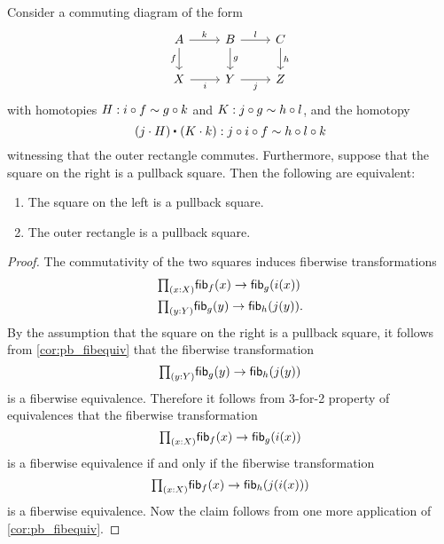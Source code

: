 \begin{cor}\label{thm:pb_pasting}
Consider a commuting diagram of the form
\begin{equation*}
\begin{tikzcd}
A \arrow[r,"k"] \arrow[d,swap,"f"] & B \arrow[r,"l"] \arrow[d,"g"] & C \arrow[d,"h"] \\
X \arrow[r,swap,"i"] & Y \arrow[r,swap,"j"] & Z
\end{tikzcd}
\end{equation*}
with homotopies $H:i\circ f\sim g\circ k$ and $K:j\circ g\sim h\circ l$, and the homotopy
\begin{equation*}
\ct{(j\cdot H)}{(K\cdot k)}:j\circ i\circ f\htpy h\circ l\circ k
\end{equation*}
witnessing that the outer rectangle commutes. Furthermore, suppose that the square on the right is a pullback square. Then the following are equivalent:
\begin{samepage}%
\begin{enumerate}
\item The square on the left is a pullback square.
\item The outer rectangle is a pullback square.
\end{enumerate}%
\end{samepage}%
\end{cor}

\begin{proof}
The commutativity of the two squares induces fiberwise transformations
\begin{align*}
& \prd{x:X}\fib{f}{x}\to \fib{g}{i(x)} \\
& \prd{y:Y}\fib{g}{y}\to \fib{h}{j(y)}.
\end{align*}
By the assumption that the square on the right is a pullback square, it follows from \cref{cor:pb_fibequiv} that the fiberwise transformation
\begin{equation*}
\prd{y:Y}\fib{g}{y}\to\fib{h}{j(y)}
\end{equation*}
is a fiberwise equivalence. Therefore it follows from 3-for-2 property of equivalences that the fiberwise transformation
\begin{equation*}
\prd{x:X}\fib{f}{x}\to\fib{g}{i(x)}
\end{equation*}
is a fiberwise equivalence if and only if the fiberwise transformation
\begin{equation*}
\prd{x:X}\fib{f}{x}\to\fib{h}{j(i(x))}
\end{equation*}
is a fiberwise equivalence. Now the claim follows from one more application of \cref{cor:pb_fibequiv}.
\end{proof}

